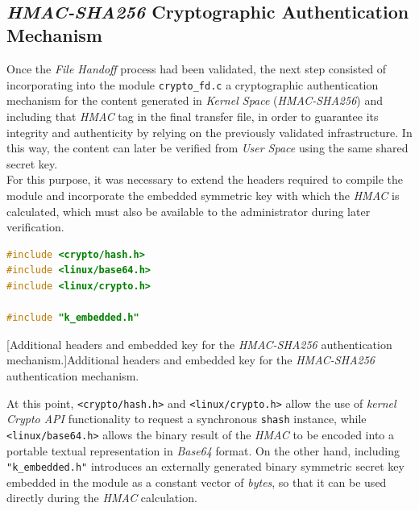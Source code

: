 \

\subsection{\textit{HMAC-SHA256} Cryptographic Authentication Mechanism}
\label{sec:proto-crypto}

Once the \textit{File Handoff} process had been validated, the next step consisted of incorporating into the module \verb|crypto_fd.c| a cryptographic authentication mechanism for the content generated in \textit{Kernel Space} (\textit{HMAC-SHA256}) and including that \textit{HMAC} tag in the final transfer file, in order to guarantee its integrity and authenticity by relying on the previously validated infrastructure.
In this way, the content can later be verified from \textit{User Space} using the same shared secret key.\\

For this purpose, it was necessary to extend the headers required to compile the module and incorporate the embedded symmetric key with which the \textit{HMAC} is calculated, which must also be available to the administrator during later verification.\\

\begin{lstlisting}[language=C]
#include <crypto/hash.h>
#include <linux/base64.h>
#include <linux/crypto.h>

#include "k_embedded.h"
\end{lstlisting}
\captionsetup{type=code,justification=centering,singlelinecheck=false}
[Additional headers and embedded key for the \textit{HMAC-SHA256} authentication mechanism.]{Additional headers and embedded key for the \textit{HMAC-SHA256} authentication mechanism.}
\label{cod:crypto_headers}
\vspace{\baselineskip}

At this point, \verb|<crypto/hash.h>| and \verb|<linux/crypto.h>| allow the use of \textit{kernel Crypto API} functionality to request a synchronous \verb|shash| instance, while \verb|<linux/base64.h>| allows the binary result of the \textit{HMAC} to be encoded into a portable textual representation in \textit{Base64} format.
On the other hand, including \verb|"k_embedded.h"| introduces an externally generated binary symmetric secret key embedded in the module as a constant vector of \textit{bytes}, so that it can be used directly during the \textit{HMAC} calculation.\\

